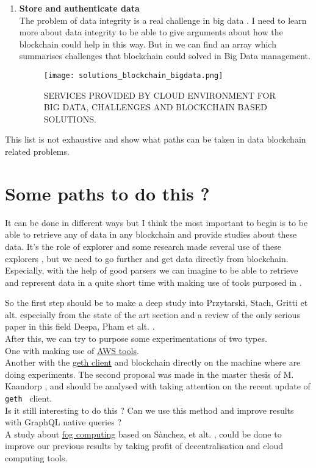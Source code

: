 \documentclass[12pt]{article}
\begin{document}
\begin{enumerate}
\item {\bf Store and authenticate data} \\ 
The problem of data integrity is a real challenge in big data \cite{survey-bigdata-blockchain}. I need to learn more about data integrity to be able to give arguments about how the blockchain could help in this way. But in \cite{survey-bigdata-blockchain} we can find an array which summarises challenges that blockchain could solved in Big Data management.

\begin{figure}[h!]
\centering
\texttt{[image: solutions\_blockchain\_bigdata.png]}
\caption{SERVICES PROVIDED BY CLOUD ENVIRONMENT FOR BIG DATA, CHALLENGES AND BLOCKCHAIN BASED SOLUTIONS.}

\end{figure}

\end{enumerate}

This list is not exhaustive and show what paths can be taken in data blockchain related problems.


\section{Some paths to do this ?}

It can be done in different ways but I think the most important to begin is to be able to retrieve any of data in any blockchain and provide studies about these data. It's the role of explorer and some research made several use of these explorers \cite{wash-trade}, but we need to go further and get data directly from blockchain.  
Especially, with the help of good parsers we can imagine to be able to retrieve and represent data in a quite short time with making use of tools purposed in \cite{data-viz}.

So the first step should be to make a deep study into Przytarski, Stach, Gritti et alt. \cite{query} especially from the state of the art section and a review of the only serious paper in this field Deepa, Pham et alt. \cite{survey-bigdata-blockchain}.\\
After this, we can try to purpose some experimentations of two types. \\
One with making use of \href{https://aws.amazon.com/blogs/database/access-bitcoin-and-ethereum-open-datasets-for-cross-chain-analytics/}{AWS tools}.\\ 
Another with the \href{https://github.com/ethereum/go-ethereum}{geth client} and blockchain directly on the machine where are doing experiments. The second proposal was made in the master thesis of M. Kaandorp \cite{query-thesis}, and should be analysed with taking attention on the recent update of \texttt{geth} \cite{geth} client. \\
Is it still interesting to do this ? Can we use this method and improve results with GraphQL native queries ?\\
A study about \href{https://en.wikipedia.org/wiki/Fog_computing}{fog computing} based on Sànchez, et alt. \cite{fogcomputing}, could be done to improve our previous results by taking profit of decentralisation and cloud computing tools.\\
 
\end{document}
